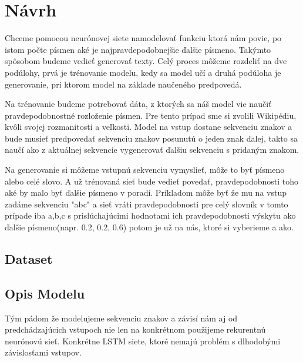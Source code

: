 \section{Návrh}

Chceme pomocou neurónovej siete namodelovať funkciu ktorá nám povie, po istom počte písmen aké je najpravdepodobnejšie ďalšie písmeno. Takýmto spôsobom budeme vedieť generovať texty. Celý proces môžeme rozdeliť na dve podúlohy, prvá je trénovanie modelu, kedy sa model učí a druhá podúloha je generovanie, pri ktorom model na základe naučeného predpovedá.

Na trénovanie budeme potrebovať dáta, z ktorých sa náš model vie naučiť pravdepodobnostné rozloženie písmen. Pre tento prípad sme si zvolili Wikipédiu, kvôli svojej rozmanitosti a veľkosti. Model na vstup dostane sekvenciu znakov a bude musieť predpovedať sekvenciu znakov posunutú o jeden znak ďalej, takto sa naučí ako z aktuálnej sekvencie vygenerovať ďalšiu sekvenciu s pridaným znakom.

Na generovanie si môžeme vstupnú sekvenciu vymyslieť, môže to byť písmeno alebo celé slovo. A už trénovaná sieť bude vedieť povedať, pravdepodobnosti toho aké by malo byť ďalšie písmeno v poradí. Príkladom môže byť že mu na vstup zadáme sekvenciu "abc" a sieť vráti pravdepodobnosti pre celý slovník v tomto prípade iba a,b,c s prislúchajúcimi hodnotami ich pravdepodobnosti výskytu ako ďalšie písmeno(napr. 0.2, 0.2, 0.6) potom je už na nás, ktoré si vyberieme a ako.



\subsection{Dataset}

\subsection{Opis Modelu}
Tým pádom že modelujeme sekvenciu znakov a závisí nám aj od predchádzajúcich  vstupoch nie len na konkrétnom použijeme rekurentnú neurónovú sieť. Konkrétne LSTM siete, ktoré nemajú problém s dlhodobými závislosťami vstupov.

